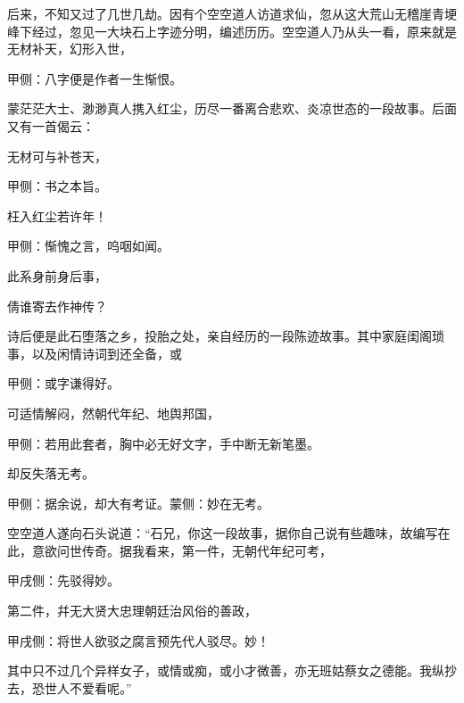 \begin{parag}
    后来，不知又过了几世几劫。因有个空空道人访道求仙，忽从这大荒山无稽崖青埂峰下经过，忽见一大块石上字迹分明，编述历历。空空道人乃从头一看，原来就是无材补天，幻形入世，\begin{note}甲侧：八字便是作者一生惭恨。\end{note}蒙茫茫大士、渺渺真人携入红尘，历尽一番离合悲欢、炎凉世态的一段故事。后面又有一首偈云：
\end{parag}


\begin{poem}
    \begin{pl} 无材可与补苍天，\end{pl}\begin{note}甲侧：书之本旨。\end{note}

    \begin{pl} 枉入红尘若许年！\end{pl}\begin{note}甲侧：惭愧之言，呜咽如闻。\end{note}

    \begin{pl} 此系身前身后事，\end{pl}

    \begin{pl} 倩谁寄去作神传？\end{pl}
\end{poem}


\begin{parag}
    诗后便是此石堕落之乡，投胎之处，亲自经历的一段陈迹故事。其中家庭闺阁琐事，以及闲情诗词到还全备，或\begin{note}甲侧：或字谦得好。\end{note}可适情解闷，然朝代年纪、地舆邦国，\begin{note}甲侧：若用此套者，胸中必无好文字，手中断无新笔墨。\end{note}却反失落无考。\begin{note}甲侧：据余说，却大有考证。蒙侧：妙在无考。\end{note}
\end{parag}


\begin{parag}
    空空道人遂向石头说道：“石兄，你这一段故事，据你自己说有些趣味，故编写在此，意欲问世传奇。据我看来，第一件，无朝代年纪可考，\begin{note}甲戌侧：先驳得妙。\end{note}第二件，幷无大贤大忠理朝廷治风俗的善政，\begin{note}甲戌侧：将世人欲驳之腐言预先代人驳尽。妙！\end{note}其中只不过几个异样女子，或情或痴，或小才微善，亦无班姑蔡女之德能。我纵抄去，恐世人不爱看呢。”
\end{parag}



